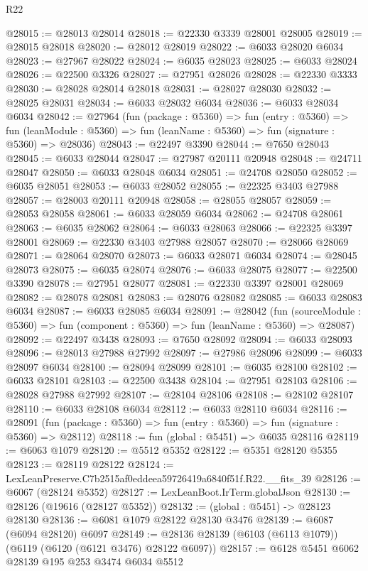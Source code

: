 \begin{lexlean}{R22}
\begin{coremodule}
@28015 := @28013 @28014
@28018 := @22330 @3339 @28001 @28005
@28019 := @28015 @28018
@28020 := @28012 @28019
@28022 := @6033 @28020 @6034
@28023 := @27967 @28022
@28024 := @6035 @28023
@28025 := @6033 @28024
@28026 := @22500 @3326
@28027 := @27951 @28026
@28028 := @22330 @3333
@28030 := @28028 @28014 @28018
@28031 := @28027 @28030
@28032 := @28025 @28031
@28034 := @6033 @28032 @6034
@28036 := @6033 @28034 @6034
@28042 := @27964
    (fun (package : @5360) =>
    fun (entry : @5360) =>
    fun (leanModule : @5360) => fun (leanName : @5360) => fun (signature : @5360) => @28036)
@28043 := @22497 @3390
@28044 := @7650 @28043
@28045 := @6033 @28044
@28047 := @27987 @20111 @20948
@28048 := @24711 @28047
@28050 := @6033 @28048 @6034
@28051 := @24708 @28050
@28052 := @6035 @28051
@28053 := @6033 @28052
@28055 := @22325 @3403 @27988
@28057 := @28003 @20111 @20948
@28058 := @28055 @28057
@28059 := @28053 @28058
@28061 := @6033 @28059 @6034
@28062 := @24708 @28061
@28063 := @6035 @28062
@28064 := @6033 @28063
@28066 := @22325 @3397 @28001
@28069 := @22330 @3403 @27988 @28057
@28070 := @28066 @28069
@28071 := @28064 @28070
@28073 := @6033 @28071 @6034
@28074 := @28045 @28073
@28075 := @6035 @28074
@28076 := @6033 @28075
@28077 := @22500 @3390
@28078 := @27951 @28077
@28081 := @22330 @3397 @28001 @28069
@28082 := @28078 @28081
@28083 := @28076 @28082
@28085 := @6033 @28083 @6034
@28087 := @6033 @28085 @6034
@28091 := @28042
    (fun (sourceModule : @5360) => fun (component : @5360) => fun (leanName : @5360) => @28087)
@28092 := @22497 @3438
@28093 := @7650 @28092
@28094 := @6033 @28093
@28096 := @28013 @27988 @27992
@28097 := @27986 @28096
@28099 := @6033 @28097 @6034
@28100 := @28094 @28099
@28101 := @6035 @28100
@28102 := @6033 @28101
@28103 := @22500 @3438
@28104 := @27951 @28103
@28106 := @28028 @27988 @27992
@28107 := @28104 @28106
@28108 := @28102 @28107
@28110 := @6033 @28108 @6034
@28112 := @6033 @28110 @6034
@28116 := @28091 (fun (package : @5360) => fun (entry : @5360) => fun (signature : @5360) => @28112)
@28118 := fun (global : @5451) => @6035 @28116
@28119 := @6063 @1079
@28120 := @5512 @5352
@28122 := @5351 @28120 @5355
@28123 := @28119 @28122
@28124 := LexLeanPreserve.C7b2515af0eddeea59726419a6840f51f.R22.__fits_39
@28126 := @6067 (@28124 @5352)
@28127 := LexLeanBoot.IrTerm.globalJson
@28130 := @28126 (@19616 (@28127 @5352))
@28132 := (global : @5451) -> @28123 @28130
@28136 := @6081 @1079 @28122 @28130 @3476
@28139 := @6087 (@6094 @28120) @6097
@28149 := @28136 @28139 (@6103 (@6113 @1079)) (@6119 (@6120 (@6121 @3476) @28122 @6097))
@28157 := @6128 @5451 @6062 @28139 @195 @253 @3474 @6034 @5512

\end{coremodule}
\end{lexlean}
